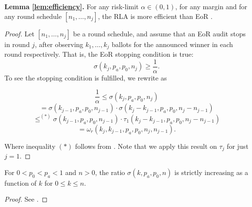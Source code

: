 \textbf{Lemma \ref{lem:efficiency}.}
For any risk-limit $\alpha \in (0, 1)$, for any margin
and for any round schedule $[n_1, \ldots, n_j]$, 
the \Providence RLA is more efficient than EoR \BRAVO.

\begin{proof}
Let $[n_1, \ldots, n_j]$ be a round schedule, and assume that an EoR \BRAVO audit stops in round $j$, after observing $k_1, \ldots, k_j$ ballots for the announced winner in each round respectively.
That is, the EoR \BRAVO stopping condition is true:
$$\sigma(k_j,p_a,p_0,n_j) \ge \frac{1}{\alpha}.$$
To see the \Providence stopping condition is fulfilled, we rewrite as 




\[
 \frac{1}{\alpha} \leq \sigma(k_{j}, p_a, p_0, n_{j}) 
\]
\[
 = \sigma(k_{j-1}, p_a, p_0, n_{j-1}) \cdot \sigma(k_j - k_{j-1}, p_a, p_0, n_j - n_{j-1})  
\]
\[
 \leq^{(*)} \sigma(k_{j-1}, p_a, p_0, n_{j-1}) \cdot \tau_1(k_j - k_{j-1}, p_a, p_0, n_j - n_{j-1}) 
\]
\[
 = \omega_r(k_j, k_{j-1}, p_a, p_0, n_j, n_{j-1}).
\]

Where inequality $(*)$ follows from \cite[Theorem 6]{arxiv_athena}. Note that we apply this result on $\tau_j$ for just $j=1$.


% 
% 
% 
\end{proof}
\begin{lemma}
    \label{lemma:sigma_increasing}
For $0<p_0< p_a< 1$ and $n>0$, the ratio $\sigma(k,p_a,p_0,n)$ is strictly increasing as a function of $k$ for $0\le k\le n$.
\end{lemma}
\begin{proof}
See \cite[Lemma 4]{usenix_minerva}. 
\end{proof}

